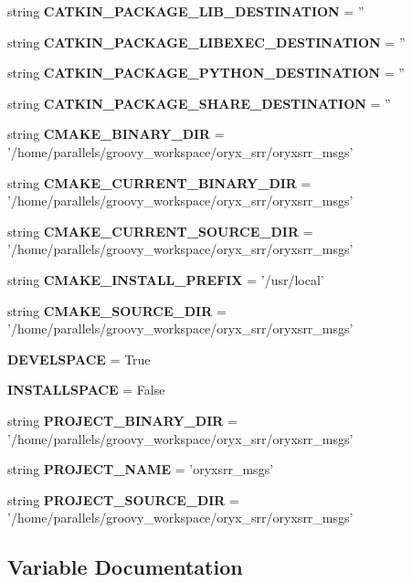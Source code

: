 \begin{DoxyCompactItemize}
\item 
string {\bf \-C\-A\-T\-K\-I\-N\-\_\-\-P\-A\-C\-K\-A\-G\-E\-\_\-\-L\-I\-B\-\_\-\-D\-E\-S\-T\-I\-N\-A\-T\-I\-O\-N} = ''
\item 
string {\bf \-C\-A\-T\-K\-I\-N\-\_\-\-P\-A\-C\-K\-A\-G\-E\-\_\-\-L\-I\-B\-E\-X\-E\-C\-\_\-\-D\-E\-S\-T\-I\-N\-A\-T\-I\-O\-N} = ''
\item 
string {\bf \-C\-A\-T\-K\-I\-N\-\_\-\-P\-A\-C\-K\-A\-G\-E\-\_\-\-P\-Y\-T\-H\-O\-N\-\_\-\-D\-E\-S\-T\-I\-N\-A\-T\-I\-O\-N} = ''
\item 
string {\bf \-C\-A\-T\-K\-I\-N\-\_\-\-P\-A\-C\-K\-A\-G\-E\-\_\-\-S\-H\-A\-R\-E\-\_\-\-D\-E\-S\-T\-I\-N\-A\-T\-I\-O\-N} = ''
\item 
string {\bf \-C\-M\-A\-K\-E\-\_\-\-B\-I\-N\-A\-R\-Y\-\_\-\-D\-I\-R} = '/home/parallels/groovy\-\_\-workspace/oryx\-\_\-srr/oryxsrr\-\_\-msgs'
\item 
string {\bf \-C\-M\-A\-K\-E\-\_\-\-C\-U\-R\-R\-E\-N\-T\-\_\-\-B\-I\-N\-A\-R\-Y\-\_\-\-D\-I\-R} = '/home/parallels/groovy\-\_\-workspace/oryx\-\_\-srr/oryxsrr\-\_\-msgs'
\item 
string {\bf \-C\-M\-A\-K\-E\-\_\-\-C\-U\-R\-R\-E\-N\-T\-\_\-\-S\-O\-U\-R\-C\-E\-\_\-\-D\-I\-R} = '/home/parallels/groovy\-\_\-workspace/oryx\-\_\-srr/oryxsrr\-\_\-msgs'
\item 
string {\bf \-C\-M\-A\-K\-E\-\_\-\-I\-N\-S\-T\-A\-L\-L\-\_\-\-P\-R\-E\-F\-I\-X} = '/usr/local'
\item 
string {\bf \-C\-M\-A\-K\-E\-\_\-\-S\-O\-U\-R\-C\-E\-\_\-\-D\-I\-R} = '/home/parallels/groovy\-\_\-workspace/oryx\-\_\-srr/oryxsrr\-\_\-msgs'
\item 
{\bf \-D\-E\-V\-E\-L\-S\-P\-A\-C\-E} = \-True
\item 
{\bf \-I\-N\-S\-T\-A\-L\-L\-S\-P\-A\-C\-E} = \-False
\item 
string {\bf \-P\-R\-O\-J\-E\-C\-T\-\_\-\-B\-I\-N\-A\-R\-Y\-\_\-\-D\-I\-R} = '/home/parallels/groovy\-\_\-workspace/oryx\-\_\-srr/oryxsrr\-\_\-msgs'
\item 
string {\bf \-P\-R\-O\-J\-E\-C\-T\-\_\-\-N\-A\-M\-E} = 'oryxsrr\-\_\-msgs'
\item 
string {\bf \-P\-R\-O\-J\-E\-C\-T\-\_\-\-S\-O\-U\-R\-C\-E\-\_\-\-D\-I\-R} = '/home/parallels/groovy\-\_\-workspace/oryx\-\_\-srr/oryxsrr\-\_\-msgs'
\end{DoxyCompactItemize}


\subsection{\-Variable \-Documentation}
